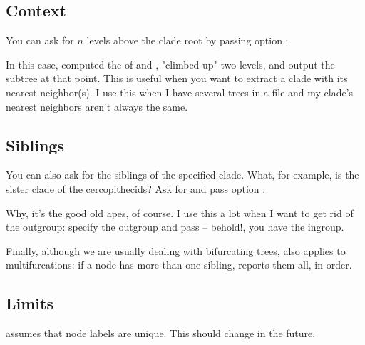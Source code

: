 \subsection{Context}

You can ask for $n$ levels above the clade root by passing option : 


\noindent{}In this case, \clade{} computed the \lca{} of  and
, "climbed up" two levels, and output the subtree at that point.
This is useful when you want to extract a clade with its nearest neighbor(s). I
use this when I have several trees in a file and my clade's nearest neighbors
aren't always the same.

\subsection{Siblings}

You can also ask for the siblings of the specified clade. What, for example, is
the sister clade of the cercopithecids? Ask for  and
pass option :


\noindent{}Why, it's the good old apes, of course. I use this a lot when I
want to get rid of the outgroup: specify the outgroup and pass  --
behold!, you have the ingroup.

Finally, although we are usually dealing with bifurcating trees, 
also applies to multifurcations: if a node has more than one sibling, \clade{} reports them all, in \nw{} order.

\subsection{Limits}

\clade{} assumes that node labels are unique. This should change in the future.
